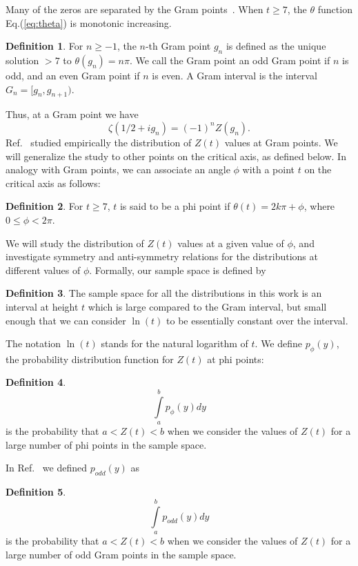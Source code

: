 \documentclass[twoside]{article}
\theoremstyle{definition}
\newtheorem{defn}{Definition}
\begin{document}
Many of the zeros are separated by the
Gram points~\cite{Gram 1903}.  When $t \ge 7$, the $\theta$ function Eq.(\ref{eq:theta}) is monotonic increasing. 
\begin{defn}\label{gram}
For $n \ge -1$, the $n$-th Gram point $g_n$ is defined as the unique solution $> 7$ to
$\theta (g_n) = n\pi$. We call the Gram point an odd Gram point if $n$ is odd, and an even Gram point if $n$ is even.
A Gram interval is the interval $G_n = [g_n,g_{n+1})$.
\end{defn}
Thus, at a Gram point we have
\begin{equation}
\zeta(1/2+ig_n) = (-1)^{n}Z(g_n).
\label{eq:zetagram}
\end{equation}
Ref.~\cite{Shanker 2018} studied empirically the distribution of $Z(t)$ values at Gram points. We will generalize the study to other points on
the critical axis, as defined below. In analogy with Gram points, we can associate an angle $\phi$ with a point $t$ on the critical axis as follows:
\begin{defn}\label{phi}
For $t \ge 7$, $t$ is said to be a phi point if
$\theta (t) = 2k\pi + \phi$, where $0 \le \phi < 2\pi$.
\end{defn}
We will study the distribution of $Z(t)$ values at a given value of $\phi$, and investigate symmetry and anti-symmetry relations for the 
distributions at different values of $\phi$. Formally, our sample space is defined by
\begin{defn}\label{samplespace}The sample space for all the distributions in this work is an interval  at height $t$ which is large compared to the Gram interval, but small enough that we can consider {$\ln (t)$} to be essentially constant over the interval. 
\end{defn}
The notation $\ln (t)$ stands for the natural logarithm of $t$.  We define $p_{\phi}(y)$, the probability distribution function for $Z(t)$ at phi points:
\begin{defn}\label{pphi}
\begin{equation}
\int\limits_{a}^{b} p_{\phi}(y)dy
\label{eq:pdfphi}
\end{equation}
is the probability that $a<Z(t)<b$ when we consider the values of $Z(t)$ for a large number of phi points in the sample space. 
\end{defn}
In Ref.~\cite{Shanker 2018}  we defined $p_{odd}(y)$ as
\begin{defn}\label{podd}
\begin{equation}
\int\limits_{a}^{b} p_{odd}(y)dy
\label{eq:pdfodd}
\end{equation}
is the probability that $a<Z(t)<b$ when we consider the values of $Z(t)$ for a large number of odd Gram points in the sample space. 
\end{defn}
\end{document}
